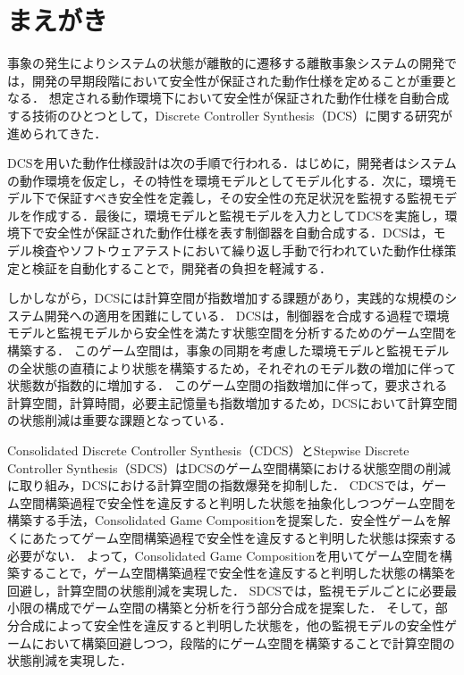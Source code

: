 \section{まえがき}
\label{section:introduction}
事象の発生によりシステムの状態が離散的に遷移する離散事象システムの開発では，開発の早期段階において安全性が保証された動作仕様を定めることが重要となる．
想定される動作環境下において安全性が保証された動作仕様を自動合成する技術のひとつとして，Discrete Controller Synthesis（DCS）\cite{paper:SupervisoryControl}に関する研究が進められてきた．

DCSを用いた動作仕様設計は次の手順で行われる．はじめに，開発者はシステムの動作環境を仮定し，その特性を環境モデルとしてモデル化する．次に，環境モデル下で保証すべき安全性を定義し，その安全性の充足状況を監視する監視モデルを作成する．最後に，環境モデルと監視モデルを入力としてDCSを実施し，環境下で安全性が保証された動作仕様を表す制御器を自動合成する．DCSは，モデル検査やソフトウェアテストにおいて繰り返し手動で行われていた動作仕様策定と検証を自動化することで，開発者の負担を軽減する．

しかしながら，DCSには計算空間が指数増加する課題があり，実践的な規模のシステム開発への適用を困難にしている．
DCSは，制御器を合成する過程で環境モデルと監視モデルから安全性を満たす状態空間を分析するためのゲーム空間を構築する．
このゲーム空間は，事象の同期を考慮した環境モデルと監視モデルの全状態の直積により状態を構築するため，それぞれのモデル数の増加に伴って状態数が指数的に増加する．
このゲーム空間の指数増加に伴って，要求される計算空間，計算時間，必要主記憶量も指数増加するため，DCSにおいて計算空間の状態削減は重要な課題となっている．

Consolidated Discrete Controller Synthesis（CDCS）\cite{yamauchi:IPSJ2024}とStepwise Discrete Controller Synthesis（SDCS）\cite{yamauchi:IEICEJ2023}はDCSのゲーム空間構築における状態空間の削減に取り組み，DCSにおける計算空間の指数爆発を抑制した．
CDCS\cite{yamauchi:IPSJ2024}では，ゲーム空間構築過程で安全性を違反すると判明した状態を抽象化しつつゲーム空間を構築する手法，Consolidated Game Compositionを提案した．安全性ゲームを解くにあたってゲーム空間構築過程で安全性を違反すると判明した状態は探索する必要がない．
よって，Consolidated Game Compositionを用いてゲーム空間を構築することで，ゲーム空間構築過程で安全性を違反すると判明した状態の構築を回避し，計算空間の状態削減を実現した．
SDCS\cite{yamauchi:IEICEJ2023}では，監視モデルごとに必要最小限の構成でゲーム空間の構築と分析を行う部分合成を提案した．
そして，部分合成によって安全性を違反すると判明した状態を，他の監視モデルの安全性ゲームにおいて構築回避しつつ，段階的にゲーム空間を構築することで計算空間の状態削減を実現した．

